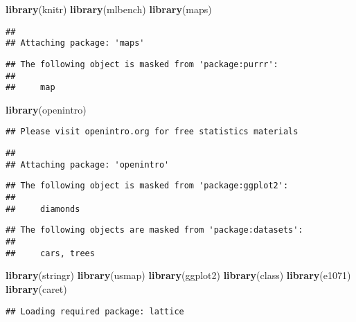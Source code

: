 \documentclass[]{article}
\newenvironment{Shaded}{\begin{snugshade}}{\end{snugshade}}
\newcommand{\KeywordTok}[1]{\textcolor[rgb]{0.13,0.29,0.53}{\textbf{#1}}}
\newcommand{\NormalTok}[1]{#1}
\begin{document}
\begin{Shaded}
\begin{Highlighting}[]
\KeywordTok{library}\NormalTok{(knitr)}
\KeywordTok{library}\NormalTok{(mlbench)}
\KeywordTok{library}\NormalTok{(maps)}
\end{Highlighting}
\end{Shaded}

\begin{verbatim}
## 
## Attaching package: 'maps'
\end{verbatim}

\begin{verbatim}
## The following object is masked from 'package:purrr':
## 
##     map
\end{verbatim}

\begin{Shaded}
\begin{Highlighting}[]
\KeywordTok{library}\NormalTok{(openintro)}
\end{Highlighting}
\end{Shaded}

\begin{verbatim}
## Please visit openintro.org for free statistics materials
\end{verbatim}

\begin{verbatim}
## 
## Attaching package: 'openintro'
\end{verbatim}

\begin{verbatim}
## The following object is masked from 'package:ggplot2':
## 
##     diamonds
\end{verbatim}

\begin{verbatim}
## The following objects are masked from 'package:datasets':
## 
##     cars, trees
\end{verbatim}

\begin{Shaded}
\begin{Highlighting}[]
\KeywordTok{library}\NormalTok{(stringr)}
\KeywordTok{library}\NormalTok{(usmap)}
\KeywordTok{library}\NormalTok{(ggplot2)}
\KeywordTok{library}\NormalTok{(class)}
\KeywordTok{library}\NormalTok{(e1071)}
\KeywordTok{library}\NormalTok{(caret)}
\end{Highlighting}
\end{Shaded}

\begin{verbatim}
## Loading required package: lattice
\end{verbatim}
\end{document}
